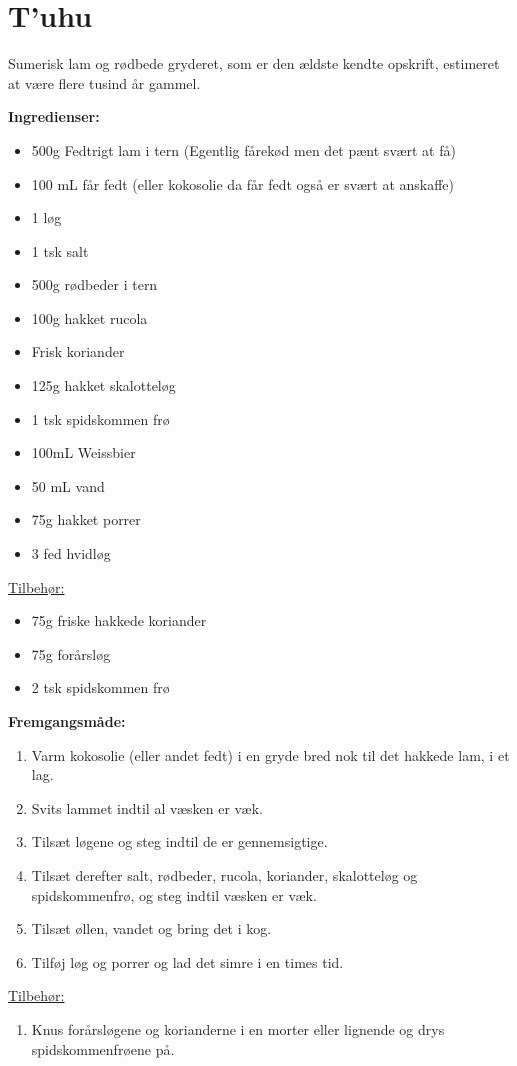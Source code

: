\documentclass{book}
\begin{document}
\newpage \section{T'uhu}
Sumerisk lam og rødbede gryderet, som er den ældste kendte opskrift, estimeret at være flere tusind år gammel. 

\begin{minipage}[t]{0.5\textwidth}
\textbf{Ingredienser:}
\begin{itemize}
    \item 500g Fedtrigt lam i tern (Egentlig fårekød men det pænt svært at få)
    \item 100 mL får fedt (eller kokosolie da får fedt også er svært at anskaffe)
    \item 1 løg
    \item 1 tsk salt
    \item 500g rødbeder i tern
    \item 100g hakket rucola
    \item Frisk koriander
    \item 125g hakket skalotteløg
    \item 1 tsk spidskommen frø
    \item 100mL Weissbier
    \item 50 mL vand
    \item 75g hakket porrer
    \item 3 fed hvidløg
\end{itemize}
\underline{Tilbehør:}
\begin{itemize}
    \item 75g friske hakkede koriander
    \item 75g forårsløg
    \item 2 tsk spidskommen frø
\end{itemize}
\end{minipage}%
\begin{minipage}[t]{0.5\textwidth}
\textbf{Fremgangsmåde:}
\begin{enumerate}
    \item Varm kokosolie (eller andet fedt) i en gryde bred nok til det hakkede lam, i et lag.
    \item Svits lammet indtil al væsken er væk.
    \item Tilsæt løgene og steg indtil de er gennemsigtige.
    \item Tilsæt derefter salt, rødbeder, rucola, koriander, skalotteløg og spidskommenfrø, og steg indtil væsken er væk.
    \item Tilsæt øllen, vandet og bring det i kog.
    \item Tilføj løg og porrer og lad det simre i en times tid.
\end{enumerate}
\underline{Tilbehør:}
\begin{enumerate}
    \item Knus forårsløgene og korianderne i en morter eller lignende og drys spidskommenfrøene på.
\end{enumerate}
\end{minipage}
\end{document}
